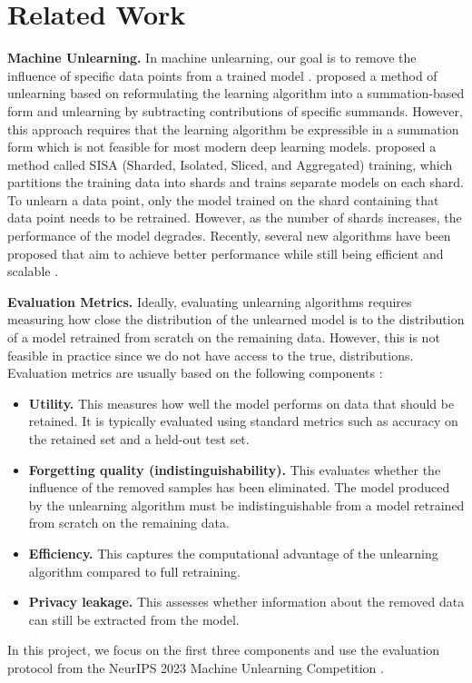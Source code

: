 \documentclass{article}
\begin{document}
\section{Related Work}
\textbf{Machine Unlearning.} In machine unlearning, our goal is to remove the influence of specific data points from a trained model \citep{bourtoule2021machine, zhang2023review}. \citet{cao2015towards} proposed a method of unlearning based on reformulating the learning algorithm into a summation-based form and unlearning by subtracting contributions of specific summands. However, this approach requires that the learning algorithm be expressible in a summation form which is not feasible for most modern deep learning models. 
\cite{bourtoule2021machine} proposed a method called SISA (Sharded, Isolated, Sliced, and Aggregated) training, which partitions the training data into shards and trains separate models on each shard. To unlearn a data point, only the model trained on the shard containing that data point needs to be retrained. However, as the number of shards increases, the performance of the model degrades. Recently, several new algorithms have been proposed that aim to achieve better performance while still being efficient and scalable \citep{cadet2025, kurmanji2023unboundedmachineunlearning, zhou2025decoupleddistillationerasegeneral}.

\textbf{Evaluation Metrics.} Ideally, evaluating unlearning algorithms requires measuring how close the distribution of the unlearned model is to the distribution of a model retrained from scratch on the remaining data. However, this is not feasible in practice since we do not have access to the true, distributions. Evaluation metrics are usually based on the following components \citep{li2025overview}: 

\begin{itemize}
    \item \textbf{Utility.} This measures how well the model performs on data that should be retained. It is typically evaluated using standard metrics such as accuracy on the retained set and a held-out test set.
    
    \item \textbf{Forgetting quality (indistinguishability).} This evaluates whether the influence of the removed samples has been eliminated. The model produced by the unlearning algorithm must be indistinguishable from a model retrained from scratch on the remaining data. 
    
    \item \textbf{Efficiency.} This captures the computational advantage of the unlearning algorithm compared to full retraining. 
    
    \item \textbf{Privacy leakage.} This assesses whether information about the removed data can still be extracted from the model. 
\end{itemize}
In this project, we focus on the first three components and use the evaluation protocol from the NeurIPS 2023 Machine Unlearning Competition \citep{neurips-2023-machine-unlearning}.
\end{document}
